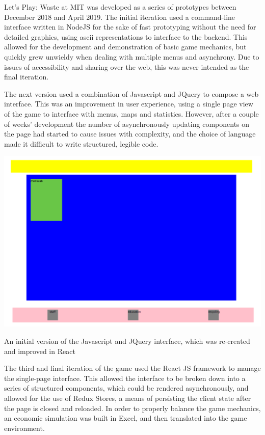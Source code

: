 \documentclass[nofonts,nols,justified,nobib]{tufte-book}
\begin{document}
Let's Play: Waste at MIT was developed as a series of prototypes between December 2018 and April 2019. The initial iteration used a command-line interface written in NodeJS for the sake of fast prototyping without the need for detailed graphics, using ascii representations to interface to the backend. This allowed for the development and demonstration of basic game mechanics, but quickly grew unwieldy when dealing with multiple menus and asynchrony. Due to issues of accessibility and sharing over the web, this was never intended as the final iteration.

The next version used a combination of Javascript and JQuery to compose a web interface. This was an improvement in user experience, using a single page view of the game to interface with menus, maps and statistics. However, after a couple of weeks' development the number of asynchronously updating components on the page had started to cause issues with complexity, and the choice of language made it difficult to write structured, legible code.


\begin{marginfigure}
\includegraphics[width=\textwidth]{img/3/prototyping/initial-map.png}
\caption{An initial version of the Javascript and JQuery interface, which was re-created and improved in React  \label{b}}
\end{marginfigure}


The third and final iteration of the game used the React JS framework to manage the single-page interface. This allowed the interface to be broken down into a series of structured components, which could be rendered asynchronously, and allowed for the use of Redux Stores, a means of persisting the client state after the page is closed and reloaded. In order to properly balance the game mechanics, an economic simulation was built in Excel, and then translated into the game environment.
\end{document}
